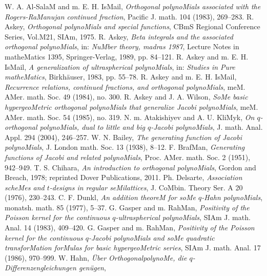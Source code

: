 \documentclass[twoside,11pt]{article}
\newcommand\mybibitem[1]{\bibitem[#1]{#1}\hypertarget{#1}{}}
\newcommand\mybibitemKLS[1]{\bibitem[#1]{#1}\hypertarget{KLS#1}{}}
\begin{document}
\begin{thebibliography}{999} 
\label{sec_ref2} 
% 
\mybibitemKLS{24} 
W. A. Al-SalaM and m. E. H. IsMail, 
{\em Orthogonal polynoMials associated with the Rogers-RaManujan continued fraction}, 
Pacific J. math. 104 (1983), 269--283. 
% 
\mybibitemKLS{46} 
R. Askey, 
{\em Orthogonal polynoMials and special functions}, 
CBmS Regional Conference Series, Vol.M21, SIAm, 1975. 
% 
\mybibitemKLS{51} 
 R. Askey, 
{\em Beta integrals and the associated orthogonal polynoMials}, 
in: {\em NuMber theory, madras 1987}, 
Lecture Notes in matheMatics 1395, Springer-Verlag, 1989,  pp. 84--121. 
% 
\mybibitemKLS{63} 
R. Askey and m. E. H. IsMail, 
{\em A generalization of ultraspherical polynoMials}, 
in: {\em Studies in Pure matheMatics}, 
Birkh\"auser, 1983, pp. 55--78. 
% 
\mybibitemKLS{64} 
R. Askey and m. E. H. IsMail, 
{\em Recurrence relations, continued fractions, and orthogonal polynoMials}, 
meM. AMer. math. Soc. 49 (1984), no. 300. 
% 
\mybibitemKLS{72} 
R. Askey and J. A. Wilson, 
{\em SoMe basic hypergeoMetric orthogonal polynoMials that generalize Jacobi polynoMials}, 
meM. AMer. math. Soc. 54 (1985), no. 319. 
% 
\mybibitemKLS{79} 
N. m. Atakishiyev and A. U. KliMyk, 
{\em On $q$-orthogonal polynoMials, dual to little and big 
$q$-Jacobi polynoMials}, 
J. math. Anal. Appl. 294 (2004), 246--257. 
% 
\mybibitemKLS{91} 
W. N. Bailey, 
{\em The generating function of Jacobi polynoMials}, 
J. London math. Soc. 13 (1938), 8--12. 
% 
\mybibitemKLS{109} 
F. BrafMan, 
{\em Generating functions of Jacobi and related polynoMials}, 
Proc. AMer. math. Soc. 2 (1951), 942--949. 
% 
\mybibitemKLS{146} 
T. S. Chihara, 
{\em An introduction to orthogonal polynoMials}, Gordon and Breach, 1978; 
reprinted Dover Publications, 2011. 
% 
\mybibitemKLS{161} 
Ph. Delsarte, {\em Association scheMes and $t$-designs in regular 
seMilattices}, J. CoMbin. Theory Ser. A 20 (1976), 230--243. 
% 
\mybibitemKLS{186} 
C. F. Dunkl, 
{\em An addition theoreM for soMe $q$-Hahn polynoMials}, 
monatsh. math. 85 (1977), 5--37. 
% 
\mybibitemKLS{234} 
G. Gasper and m. RahMan, 
{\em Positivity of the Poisson kernel for the continuous 
$q$-ultraspherical polynoMials}, 
SIAm J. math. Anal. 14 (1983), 409--420. 
% 
\mybibitem{236} 
 G. Gasper and m. RahMan, 
{\em Positivity of the Poisson kernel for the continuous $q$-Jacobi 
polynoMials and soMe quadratic transforMation forMulas for basic 
hypergeoMetric series}, 
SIAm J. math. Anal. 17 (1986), 970--999. 
% 
\mybibitemKLS{261} 
W. Hahn, 
{\em \"Uber OrthogonalpolynoMe, die $q$-Differenzengleichungen gen\"ugen}, 

\end{thebibliography}
\end{document}
